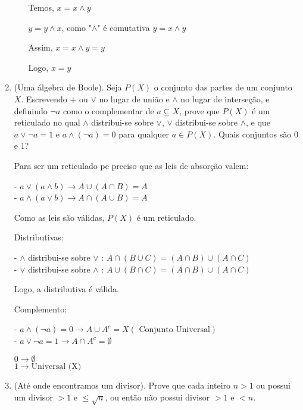 \documentclass[a4paper,12pt]{article}
\begin{document}
\begin{enumerate}[label=1.\arabic*.]
\begin{enumerate}[label=\roman*.]
      Temos, $x = x \wedge y$

      $y = y \wedge x$, como "$\wedge$" é comutativa $y = x \wedge y$

      Assim, $x = x \wedge y = y$

      Logo, $x = y$

    \end{enumerate}

    \item (Uma álgebra de Boole). Seja $P(X)$ o conjunto das partes de um conjunto $X$. 
    Escrevendo $+$ ou $\vee$ no lugar de união e $\wedge$ no lugar de interseção, e 
    definindo $\neg a$ como o complementar de $a\subseteq X$, prove que $P(X)$ é um reticulado 
    no qual $\wedge$ distribui-se sobre $\vee$, $\vee$ distribui-se sobre $\wedge$, e que 
    $a\vee \neg a = 1 $ e $a\wedge(\neg a)=0$ para qualquer $a\in P(X)$. Quais conjuntos são $0$ e $1$?

    Para ser um reticulado pe preciso que as leis de absorção valem:

    - $a \vee (a \wedge b) \rightarrow A \cup (A \cap B ) = A$ \\
    - $a \wedge (a \vee b) \rightarrow A \cap (A \cup B ) = A$

    Como as leis são válidas, $P(X)$ é um reticulado.
    
    Distributivas:

    - $\wedge$ distribui-se sobre $\vee$ : $A \cap (B \cup C) = (A \cap B) \cup (A \cap C)$\\
    - $\vee$ distribui-se sobre $\wedge$ : $A \cup (B \cap C) = (A \cap B) \cup (A \cap C)$

    Logo, a distributiva é válida.

    Complemento:

    - $a \wedge ( \neg a ) = 0 \rightarrow A \cup A^c = X (\text{ Conjunto Universal})$ \\
    - $ a \vee \neg a = 1 \rightarrow A \cap A^c = \emptyset$ 

    $0 \rightarrow \emptyset$ \\ 
    $1 \rightarrow \text{Universal (X)}$  

    \item (Até onde encontramos um divisor). Prove que cada inteiro $n>1$ ou possui um divisor 
    $>1$ e $\le\sqrt{n}$, ou então não possui divisor $>1$ e $<n$.

    \begin{enumerate}[label=\Roman*.]
      

\end{enumerate}
\end{enumerate}
\end{document}
